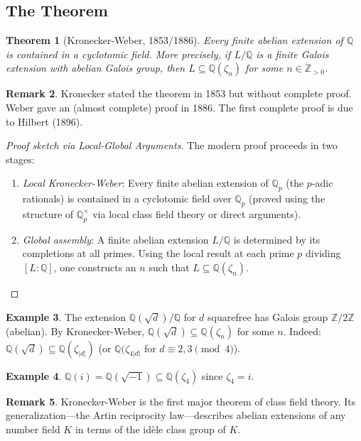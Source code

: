 \documentclass[12pt,a4paper]{amsart}
\newtheorem{theorem}{Theorem}[section]
\theoremstyle{definition}
\newtheorem{example}[theorem]{Example}
\newtheorem{remark}[theorem]{Remark}
\newcommand{\Q}{\mathbb{Q}}
\newcommand{\Z}{\mathbb{Z}}
\begin{document}
\subsection{The Theorem}

\begin{theorem}[Kronecker-Weber, 1853/1886]
\label{thm:kronweber}
Every finite abelian extension of $\Q$ is contained in a cyclotomic field.
More precisely, if $L/\Q$ is a finite Galois extension with abelian Galois
group, then $L \subseteq \Q(\zeta_n)$ for some $n \in \Z_{>0}$.
\end{theorem}

\begin{remark}
Kronecker stated the theorem in 1853 but without complete proof. Weber gave
an (almost complete) proof in 1886. The first complete proof is due to
Hilbert (1896).
\end{remark}

\begin{proof}[Proof sketch via Local-Global Arguments]
The modern proof proceeds in two stages:
\begin{enumerate}
  \item \emph{Local Kronecker-Weber}: Every finite abelian extension of $\Q_p$
        (the $p$-adic rationals) is contained in a cyclotomic field over $\Q_p$
        (proved using the structure of $\Q_p^\times$ via local class field theory
        or direct arguments).
  \item \emph{Global assembly}: A finite abelian extension $L/\Q$ is determined
        by its completions at all primes. Using the local result at each prime
        $p$ dividing $[L:\Q]$, one constructs an $n$ such that $L \subseteq
        \Q(\zeta_n)$.
\end{enumerate}
\end{proof}

\begin{example}
The extension $\Q(\sqrt{d})/\Q$ for $d$ squarefree has Galois group $\Z/2\Z$
(abelian). By Kronecker-Weber, $\Q(\sqrt{d}) \subseteq \Q(\zeta_n)$ for some
$n$. Indeed: $\Q(\sqrt{d}) \subseteq \Q(\zeta_{|d|})$ (or $\Q(\zeta_{4|d|}$
for $d \equiv 2,3 \pmod{4}$).
\end{example}

\begin{example}
$\Q(i) = \Q(\sqrt{-1}) \subseteq \Q(\zeta_4)$ since $\zeta_4 = i$.
\end{example}

\begin{remark}
Kronecker-Weber is the first major theorem of class field theory. Its
generalization—the Artin reciprocity law—describes abelian extensions of any
number field $K$ in terms of the idèle class group of $K$.
\end{remark}
\end{document}
